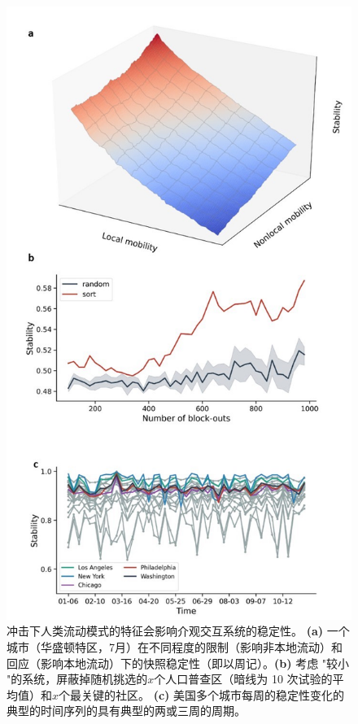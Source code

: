 \begin{figure}[h]
    \centering
    \includegraphics[width = 0.6\linewidth]{Figs/Figure2.jpg}
    \caption{冲击下人类流动模式的特征会影响介观交互系统的稳定性。 \textbf{(a)} 一个城市（华盛顿特区，7月）在不同程度的限制（影响非本地流动）和回应（影响本地流动）下的快照稳定性（即以周记）。\textbf{(b)} 考虑 "较小 "的系统，屏蔽掉随机挑选的$x$个人口普查区（暗线为 10 次试验的平均值）和$x$个最关键的社区。 \textbf{(c)} 美国多个城市每周的稳定性变化的典型的时间序列的具有典型的两或三周的周期。}
    \label{fig:allee2}
\end{figure}


